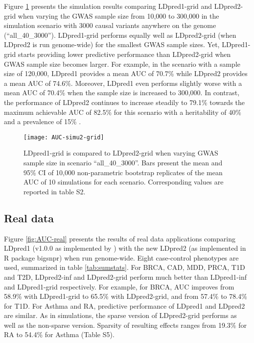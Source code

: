 \documentclass{bioinfo}
\begin{document}

Figure \ref{fig:AUC-simu2-grid} presents the simulation results comparing LDpred1-grid and LDpred2-grid when varying the GWAS sample size from 10,000 to 300,000 in the simulation scenario with 3000 causal variants anywhere on the genome (``all\_40\_3000''). 
LDpred1-grid performs equally well as LDpred2-grid (when LDpred2 is run genome-wide) for the smallest GWAS sample sizes. 
Yet, LDpred1-grid starts providing lower predictive performance than LDpred2-grid when GWAS sample size becomes larger. 
For example, in the scenario with a sample size of 120,000, LDpred1 provides a mean AUC of 70.7\% while LDpred2 provides a mean AUC of 74.6\%.
Moreover, LDpred1 even performs slightly worse with a mean AUC of 70.4\% when the sample size is increased to 300,000.
In contrast, the performance of LDpred2 continues to increase steadily to 79.1\% towards the maximum achievable AUC of 82.5\% for this scenario with a heritability of 40\% and a prevalence of 15\% \cite[]{wray2010genetic}.

\begin{figure}[htbp]
	\centering
	\texttt{[image: AUC-simu2-grid]}
	\caption{LDpred1-grid is compared to LDpred2-grid when varying GWAS sample size in scenario ``all\_40\_3000''.  
		Bars present the mean and 95\% CI of 10,000 non-parametric bootstrap replicates of the mean AUC of 10 simulations for each scenario. 
		Corresponding values are reported in table S2.
	}
	\label{fig:AUC-simu2-grid}
\end{figure}

\subsection*{Real data}

Figure \ref{fig:AUC-real} presents the results of real data applications comparing LDpred1 (v1.0.0 as implemented by \cite{vilhjalmsson2015modeling}) with the new LDpred2 (as implemented in R package bigsnpr) when run genome-wide. 
Eight case-control phenotypes are used, summarized in table \ref{tab:sumstats}.
For BRCA, CAD, MDD, PRCA, T1D and T2D, LDpred2-inf and LDpred2-grid perform much better than LDpred1-inf and LDpred1-grid respectively.
For example, for BRCA, AUC improves from 58.9\% with LDpred1-grid to 65.5\% with LDpred2-grid, and from 57.4\% to 78.4\% for T1D.
For Asthma and RA, predictive performance of LDpred1 and LDpred2 are similar.
As in simulations, the sparse version of LDpred2-grid performs as well as the non-sparse version. Sparsity of resulting effects ranges from 19.3\% for RA to 54.4\% for Asthma (Table S5).
\end{document}
